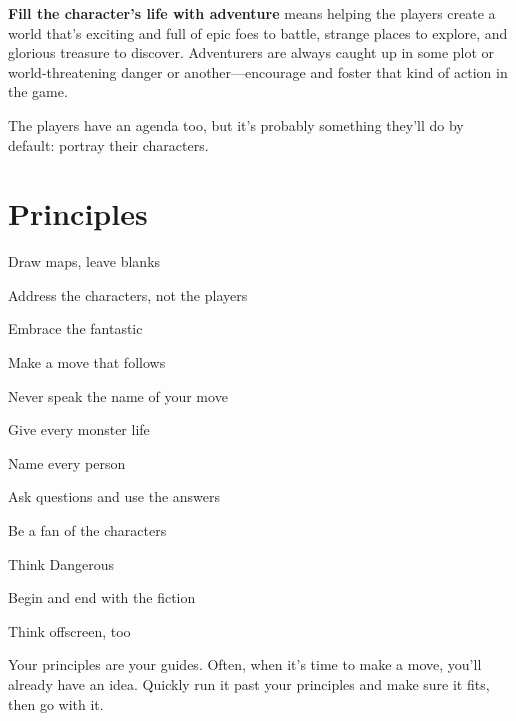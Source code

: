  

{\bf Fill the character's life with adventure}  means helping the players create a world that's exciting and full of epic foes to battle, strange places to explore, and glorious treasure to discover. Adventurers are always caught up in some plot or world-threatening danger or another—encourage and foster that kind of action in the game.

 

The players have an agenda too, but it's probably something they'll do by default: portray their characters.

 
\section{Principles}   
 
\startitemize[1,packed]

\item Draw maps, leave blanks

 
\item Address the characters, not the players

 
\item Embrace the fantastic

 
\item Make a move that follows

 
\item Never speak the name of your move

 
\item Give every monster life

 
\item Name every person

 
\item Ask questions and use the answers

 
\item Be a fan of the characters

 
\item Think Dangerous

 
\item Begin and end with the fiction

 
\item Think offscreen, too


\stopitemize
 

Your principles are your guides. Often, when it's time to make a move, you'll already have an idea. Quickly run it past your principles and make sure it fits, then go with it.

